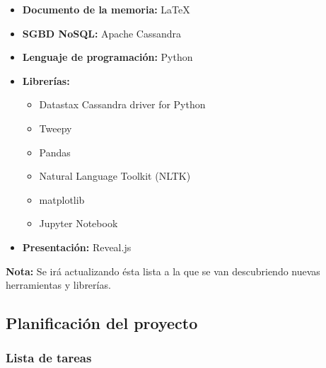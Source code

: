 \begin{itemize}
    \item \textbf{Documento de la memoria: } \LaTeX
    \item \textbf{SGBD NoSQL: } Apache Cassandra
    \item \textbf{Lenguaje de programación: } Python 
    \item \textbf{Librerías: } 
      \begin{itemize}
      \item Datastax Cassandra driver for Python
      \item Tweepy
      \item Pandas
      \item Natural Language Toolkit (NLTK)
      \item matplotlib
      \item Jupyter Notebook
      \end{itemize}
    \item \textbf{Presentación: } Reveal.js
\end{itemize}

\textbf{Nota:} Se irá actualizando ésta lista a la que se van descubriendo
nuevas herramientas y librerías.

\subsection{Planificación del proyecto}
\label{subsec:planificació}


\subsubsection{Lista de tareas}
\label{subsubsec:tasklist}

